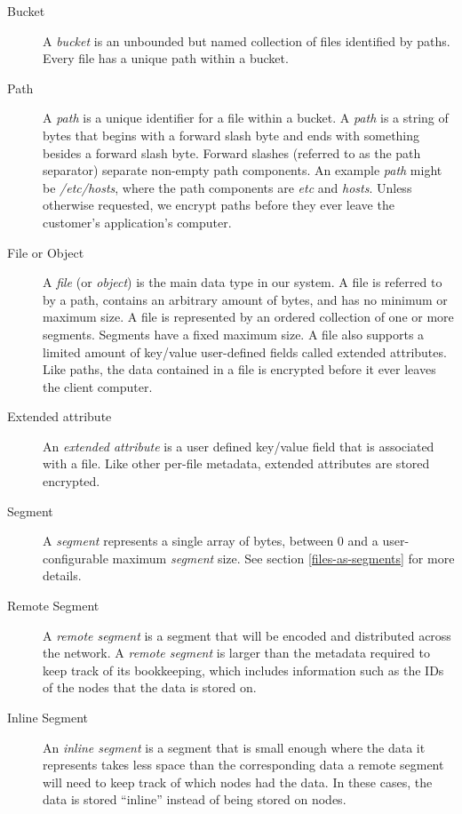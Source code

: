 \documentclass[8pt,fleqn,openany]{book}
\newcommand{\code}[1]{{\em #1}}
\begin{document}
\begin{description}
\item[Bucket] A {\em bucket} is an unbounded but named collection of files
identified by paths. Every file has a unique path within a bucket.

\item[Path] A {\em path} is a unique identifier for a file within a
bucket. A {\em path} is a string of bytes that begins with a forward
slash byte and ends with something besides a forward slash byte. Forward
slashes (referred to as the path separator) separate non-empty path components.
An example {\em path} might be \code{/etc/hosts}, where the path components are
\code{etc} and \code{hosts}.
Unless otherwise requested,
we encrypt paths before they ever leave the customer's application's
computer.

\item[File or Object] A {\em file} (or {\em object}) is the main data type in
our system. A file is referred to by a path, contains an arbitrary amount of
bytes, and has no minimum or maximum size. A file is represented by an ordered
collection of one or more segments. Segments have a fixed maximum size.
A file also supports a limited amount of key/value user-defined fields
called extended attributes.
Like paths, the data contained in a file is encrypted before it ever
leaves the client computer.

\item[Extended attribute] An {\em extended attribute} is a user defined key/value
field that is associated with a file. Like other per-file metadata,
extended attributes are stored encrypted.

\item[Segment] A {\em segment} represents a single array of bytes, between 0 and a
user-configurable maximum {\em segment} size.
See section \ref{files-as-segments} for more details.

\item[Remote Segment] A {\em remote segment} is a segment that will be
encoded and distributed across the network. A {\em remote segment} is larger than
the metadata required to keep track of its bookkeeping, which includes
information such as the IDs of the nodes that the data is stored on.

\item[Inline Segment] An {\em inline segment} is a segment that is small
enough where the data it represents takes less space than the corresponding
data a remote segment will need to keep track of which nodes had the data.
In these cases, the data is stored ``inline'' instead of being stored on nodes.


\end{description}
\end{document}
